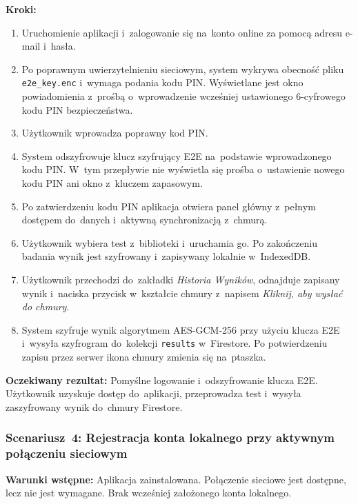 \documentclass[12pt, a4paper, oneside]{report}
\begin{document}
\textbf{Kroki:}
\begin{enumerate}[noitemsep]
	\item Uruchomienie aplikacji i~zalogowanie się na~konto online za pomocą adresu e-mail i~hasła.
	\item Po poprawnym uwierzytelnieniu sieciowym, system wykrywa obecność pliku \texttt{e2e\_key.enc} i~wymaga podania kodu PIN. Wyświetlane jest okno powiadomienia z~prośbą o~wprowadzenie wcześniej ustawionego 6-cyfrowego kodu PIN bezpieczeństwa.
	\item Użytkownik wprowadza poprawny kod PIN.
	\item System odszyfrowuje klucz szyfrujący E2E na~podstawie wprowadzonego kodu PIN. W~tym przepływie nie wyświetla się prośba o~ustawienie nowego kodu PIN ani okno z~kluczem zapasowym.
	\item Po zatwierdzeniu kodu PIN aplikacja otwiera panel główny z~pełnym dostępem do~danych i~aktywną synchronizacją z~chmurą.
	\item Użytkownik wybiera test z~biblioteki i~uruchamia go. Po zakończeniu badania
	      wynik jest szyfrowany i~zapisywany lokalnie w~IndexedDB.
	\item Użytkownik przechodzi do~zakładki \textit{Historia Wyników}, odnajduje
	      zapisany wynik i~naciska przycisk w~kształcie chmury z~napisem
	      \textit{Kliknij, aby wysłać do chmury}.
	\item System szyfruje wynik algorytmem AES-GCM-256 przy użyciu klucza E2E
	      i~wysyła szyfrogram do~kolekcji \texttt{results} w~Firestore. Po
	      potwierdzeniu zapisu przez serwer ikona chmury zmienia się na~ptaszka.
\end{enumerate}

\textbf{Oczekiwany rezultat:} Pomyślne logowanie i~odszyfrowanie klucza E2E.
Użytkownik uzyskuje dostęp do~aplikacji, przeprowadza test i~wysyła zaszyfrowany
wynik do~chmury Firestore.

\subsubsection*{Scenariusz~4: Rejestracja konta lokalnego przy aktywnym połączeniu sieciowym}
\label{scen:4}

\textbf{Warunki wstępne:} Aplikacja zainstalowana. Połączenie sieciowe jest dostępne,
lecz nie jest wymagane. Brak wcześniej założonego konta lokalnego.
\end{document}
